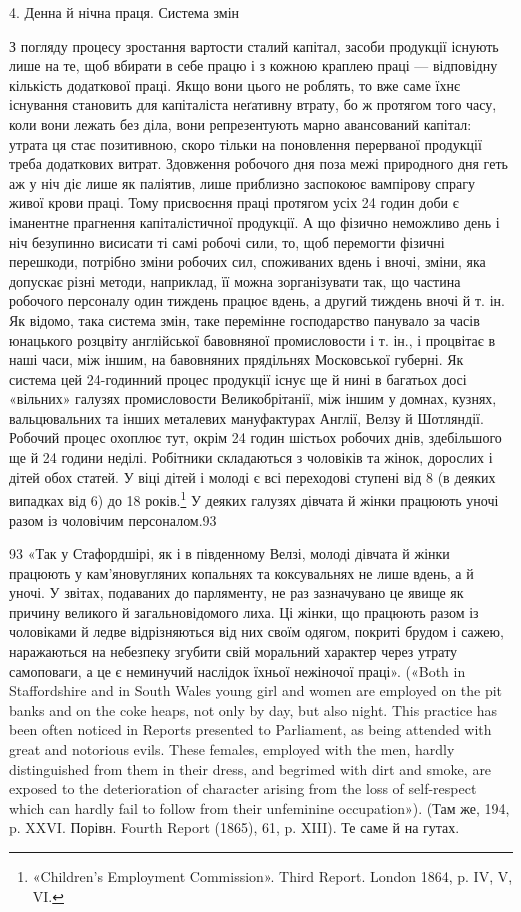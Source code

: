 4. Денна й нічна праця. Система змін

З погляду процесу зростання вартости сталий капітал, засоби
продукції існують лише на те, щоб вбирати в себе працю і з кожною
краплею праці — відповідну кількість додаткової праці.
Якщо вони цього не роблять, то вже саме їхнє існування становить
для капіталіста неґативну втрату, бо ж протягом того часу,
коли вони лежать без діла, вони репрезентують марно авансований
капітал: утрата ця стає позитивною, скоро тільки на поновлення
перерваної продукції треба додаткових витрат. Здовження
робочого дня поза межі природного дня геть аж у ніч діє
лише як паліятив, лише приблизно заспокоює вампірову спрагу
живої крови праці. Тому присвоєння праці протягом усіх 24 годин
доби є іманентне прагнення капіталістичної продукції. А що
фізично неможливо день і ніч безупинно висисати ті самі робочі
сили, то, щоб перемогти фізичні перешкоди, потрібно зміни робочих
сил, споживаних вдень і вночі, зміни, яка допускає різні
методи, наприклад, її можна зорганізувати так, що частина робочого
персоналу один тиждень працює вдень, а другий тиждень
вночі й т. ін. Як відомо, така система змін, таке перемінне господарство
панувало за часів юнацького розцвіту англійської бавовняної
промисловости і т. ін., і процвітає в наші часи, між
іншим, на бавовняних прядільнях Московської губерні. Як система
цей 24-годинний процес продукції існує ще й нині в багатьох
досі «вільних» галузях промисловости Великобрітанії, між іншим
у домнах, кузнях, вальцювальних та інших металевих мануфактурах
Англії, Велзу й Шотляндії. Робочий процес охоплює тут,
окрім 24 годин шістьох робочих днів, здебільшого ще й 24 години
неділі. Робітники складаються з чоловіків та жінок, дорослих
і дітей обох статей. У віці дітей і молоді є всі переходові ступені
від 8 (в деяких випадках від 6) до 18 років.\footnote{
«Children’s Employment Commission». Third Report. London
1864, p. IV, V, VI.
} У деяких галузях
дівчата й жінки працюють уночі разом із чоловічим персоналом.93

93 «Так у Стафордшірі, як і в південному Велзі, молоді дівчата й жінки
працюють у кам’яновугляних копальнях та коксувальнях не лише вдень,
а й уночі. У звітах, подаваних до парляменту, не раз зазначувано це
явище як причину великого й загальновідомого лиха. Ці жінки, що працюють
разом із чоловіками й ледве відрізняються від них своїм одягом,
покриті брудом і сажею, наражаються на небезпеку згубити свій моральний
характер через утрату самоповаги, а це є неминучий наслідок їхньої
нежіночої праці». («Both in Staffordshire and in South Wales young girl
and women are employed on the pit banks and on the coke heaps, not only
by day, but also night. This practice has been often noticed in Reports presented
to Parliament, as being attended with great and notorious evils.
These females, employed with the men, hardly distinguished from them
in their dress, and begrimed with dirt and smoke, are exposed to the deterioration
of character arising from the loss of self-respect which can hardly
fail to follow from their unfeminine occupation»). (Там же, 194, p. XXVI.
Порівн. Fourth Report (1865), 61, p. XIII). Те саме й на гутах.
